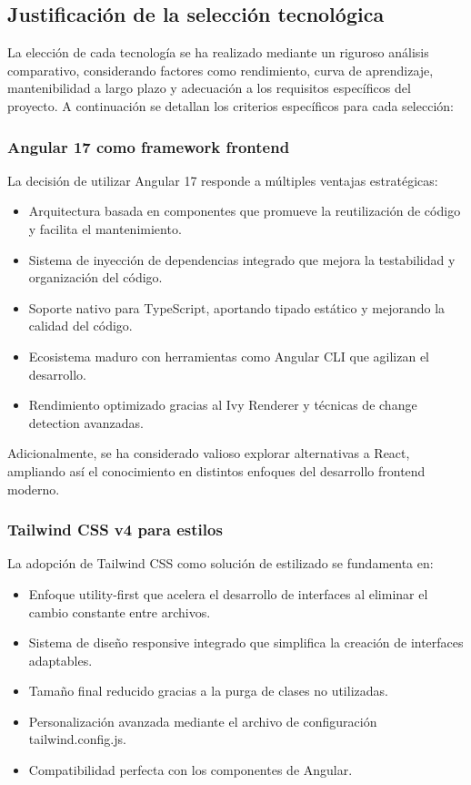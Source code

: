 \documentclass[11pt, a4paper]{article}
\begin{document}
  \subsection{Justificación de la selección tecnológica}

  La elección de cada tecnología se ha realizado mediante un riguroso análisis comparativo, considerando factores como rendimiento, curva de aprendizaje, mantenibilidad a largo plazo y adecuación a los requisitos específicos del proyecto. A continuación se detallan los criterios específicos para cada selección:

  \subsubsection{Angular 17 como framework frontend}

  La decisión de utilizar Angular 17 responde a múltiples ventajas estratégicas:

  \begin{itemize}
      \item Arquitectura basada en componentes que promueve la reutilización de código y facilita el mantenimiento.
      \item Sistema de inyección de dependencias integrado que mejora la testabilidad y organización del código.
      \item Soporte nativo para TypeScript, aportando tipado estático y mejorando la calidad del código.
      \item Ecosistema maduro con herramientas como Angular CLI que agilizan el desarrollo.
      \item Rendimiento optimizado gracias al Ivy Renderer y técnicas de change detection avanzadas.
  \end{itemize}

  Adicionalmente, se ha considerado valioso explorar alternativas a React, ampliando así el conocimiento en distintos enfoques del desarrollo frontend moderno.

  \subsubsection{Tailwind CSS v4 para estilos}
  La adopción de Tailwind CSS como solución de estilizado se fundamenta en:
  \begin{itemize}
      \item Enfoque utility-first que acelera el desarrollo de interfaces al eliminar el cambio constante entre archivos.
      \item Sistema de diseño responsive integrado que simplifica la creación de interfaces adaptables.
      \item Tamaño final reducido gracias a la purga de clases no utilizadas.
      \item Personalización avanzada mediante el archivo de configuración tailwind.config.js.
      \item Compatibilidad perfecta con los componentes de Angular.
  \end{itemize}
\end{document}
